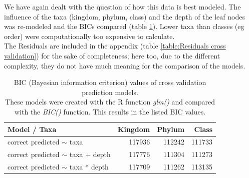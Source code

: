       We have again dealt with the question of how this data is best modeled. The influence of the taxa 
        (kingdom, phylum, class) and the depth of the leaf nodes was re-modeled and the BICs compared 
        (table \ref{table:BIC cross validation}). Lower taxa than classes (eg order) were 
        computationally too expensive to calculate. \\
      The Residuals are included in the appendix (table \ref{table:Residuals cross validation}) for the 
        sake of completeness; here too, due to the different complexity, they do not have much meaning 
        for the comparison of the models. \\


      \begin{table}[h]
        \begin{center}
          \begin{tabular}{ |l|r|r|r| }
            \hline
            \bfseries Model / Taxa & \bfseries Kingdom & \bfseries Phylum & \bfseries Class \\%
            \hline \hline
            correct predicted $\sim$ taxa & 117936 & \cellcolor{green!40}112242 & \cellcolor{green!50}111733 \\%
            \hline
            correct predicted $\sim$ taxa + depth & 117776 & \cellcolor{green!50}111304 & \cellcolor{green!50}111273 \\%
            \hline
            correct predicted $\sim$ taxa * depth & 117709 & \cellcolor{green!50}111262 & \cellcolor{green!30}113135 \\%
            \hline
          \end{tabular} 
        \end{center}
        \caption{BIC (Bayesian information criterion) values of cross validation prediction models. \\
          These models were created with the R function \textit{glm()} and compared with the 
            \textit{BIC()} function. This results in the listed BIC values.}
        \label{table:BIC cross validation} 
      \end{table}

